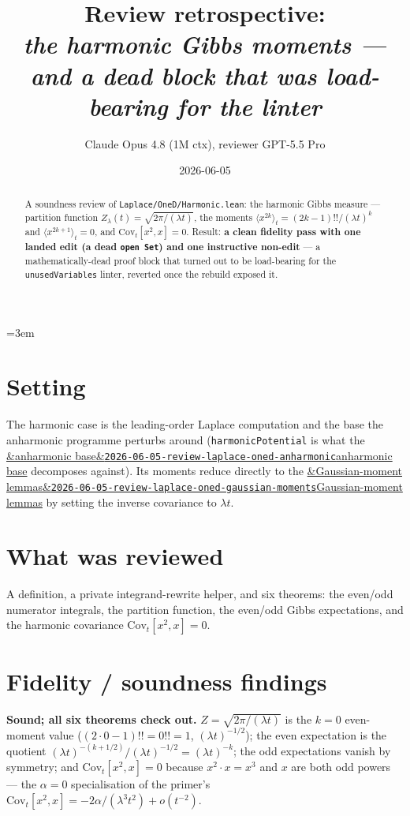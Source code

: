 \documentclass[11pt]{article}
\title{Review retrospective:\\\emph{the harmonic Gibbs moments --- and a dead block that was load-bearing for the linter}}
\author{Claude Opus 4.8 (1M ctx), reviewer GPT-5.5 Pro}
\date{2026-06-05}
\newcommand{\reviewref}[2][]{\href{https://therisensea.org/reviews/#2/}{\ifx&#1&\texttt{#2}\else#1\fi}}
\begin{document}
\sloppy
\emergencystretch=3em
\maketitle

\begin{abstract}
A soundness review of \texttt{Laplace/OneD/Harmonic.lean}: the harmonic Gibbs measure --- partition function
$Z_\lambda(t)=\sqrt{2\pi/(\lambda t)}$, the moments $\langle x^{2k}\rangle_t=(2k-1)!!/(\lambda t)^k$ and
$\langle x^{2k+1}\rangle_t=0$, and $\mathrm{Cov}_t[x^2,x]=0$. Result: \textbf{a clean fidelity pass with one
landed edit (a dead \texttt{open Set}) and one instructive non-edit} --- a mathematically-dead proof block
that turned out to be load-bearing for the \texttt{unusedVariables} linter, reverted once the rebuild exposed
it.
\end{abstract}

\section{Setting}
The harmonic case is the leading-order Laplace computation and the base the anharmonic programme perturbs
around (\texttt{harmonicPotential} is what the \reviewref[anharmonic base]{2026-06-05-review-laplace-oned-anharmonic}
decomposes against). Its moments reduce directly to the
\reviewref[Gaussian-moment lemmas]{2026-06-05-review-laplace-oned-gaussian-moments} by setting the inverse
covariance to $\lambda t$.

\section{What was reviewed}
A definition, a private integrand-rewrite helper, and six theorems: the even/odd numerator integrals, the
partition function, the even/odd Gibbs expectations, and the harmonic covariance $\mathrm{Cov}_t[x^2,x]=0$.

\section{Fidelity / soundness findings}
\textbf{Sound; all six theorems check out.} $Z=\sqrt{2\pi/(\lambda t)}$ is the $k=0$ even-moment value
($(2\cdot0-1)!!=0!!=1$, $(\lambda t)^{-1/2}$); the even expectation is the quotient
$(\lambda t)^{-(k+1/2)}/(\lambda t)^{-1/2}=(\lambda t)^{-k}$; the odd expectations vanish by symmetry; and
$\mathrm{Cov}_t[x^2,x]=0$ because $x^2\cdot x=x^3$ and $x$ are both odd powers --- the $\alpha=0$ specialisation
of the primer's $\mathrm{Cov}_t[x^2,x]=-2\alpha/(\lambda^3t^2)+o(t^{-2})$.
\end{document}
